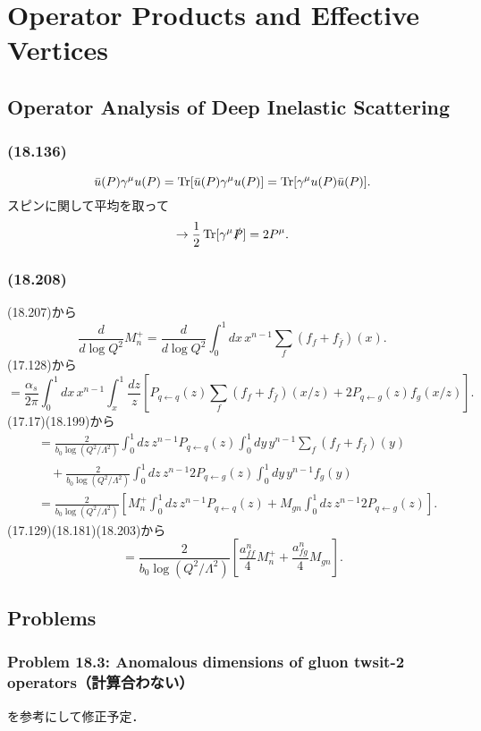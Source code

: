 \chapter{Operator Products and Effective Vertices}
\setcounter{section}{4}
\section{Operator Analysis of Deep Inelastic Scattering}
\subsection{(18.136)}
\[ \bar{u}(P) \gamma^\mu u(P) = \operatorname{Tr}[\bar{u}(P) \gamma^\mu u(P)] = \operatorname{Tr}[\gamma^\mu u(P) \bar{u}(P)] . \]
スピンに関して平均を取って
\begin{align*}
  \to \frac{1}{2} \operatorname{Tr}[\gamma^\mu \slashed{P}] = 2 P^\mu .
\end{align*}

\subsection{(18.208)}
(18.207)から
\[
\frac{d}{d\log Q^2} M_n^+ = \frac{d}{d\log Q^2} \int_0^1 dx \, x^{n-1} \sum_f (f_f + f_{\bar{f}})(x) .
\]
(17.128)から
\[
= \frac{\alpha_s}{2\pi} \int_0^1 dx \, x^{n-1} \int_x^1 \frac{dz}{z}
\left[ P_{q\leftarrow q}(z) \sum_f (f_f + f_{\bar{f}})(x/z) + 2P_{q\leftarrow g}(z) f_g(x/z) \right] .
\]
(17.17)(18.199)から
\begin{align*}
  &= \frac{2}{b_0\log(Q^2/\Lambda^2)} \int_0^1 dz \, z^{n-1} P_{q\leftarrow q}(z) \int_0^1 dy \, y^{n-1} \sum_f (f_f + f_{\bar{f}})(y) \\
  &\quad + \frac{2}{b_0\log(Q^2/\Lambda^2)} \int_0^1 dz \, z^{n-1} 2P_{q\leftarrow g}(z) \int_0^1 dy \, y^{n-1} f_g(y) \\
  &= \frac{2}{b_0\log(Q^2/\Lambda^2)}
  \left[ M_n^+ \int_0^1 dz \, z^{n-1} P_{q\leftarrow q}(z) + M_{gn} \int_0^1 dz \, z^{n-1} 2P_{q\leftarrow g}(z) \right] .
\end{align*}
(17.129)(18.181)(18.203)から
\[
= \frac{2}{b_0\log(Q^2/\Lambda^2)}
\left[ \frac{a_{ff}^n}{4} M_n^+ + \frac{a_{fg}^n}{4} M_{gn} \right] .
\]

\section*{Problems}
\subsection{Problem 18.3: Anomalous dimensions of gluon twsit-2 operators（計算合わない）}
\cite{gross1974asymptotically}を参考にして修正予定．

